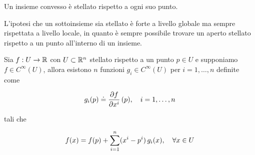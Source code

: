 \begin{remark}
	Un insieme convesso è stellato rispetto a ogni suo punto.
\end{remark}

L'ipotesi che un sottoinsieme sia stellato è forte a livello globale ma sempre rispettata a livello locale, in quanto è sempre possibile trovare un aperto stellato rispetto a un punto all'interno di un insieme.

\begin{theorem}\label{thm:taylor}
	Sia $ f : U \to \mathbb{R} $ con $ U \subset \mathbb{R}^{n} $ stellato rispetto a un punto $ p \in U $ e supponiamo $ f \in C^{\infty}(U) $, allora esistono $ n $ funzioni $ g_{i} \in C^{\infty}(U) $ per $ i = 1,\dots,n $ definite come
	
	\begin{equation}
		g_{i}(p) \doteq \pdv{f}{x^{i}} \, (p) \qcomma i=1,\dots,n
	\end{equation}

	tali che
	
	\begin{equation}
		f(x) = f(p) + \sum_{i=1}^{n} (x^{i}-p^{i}) \, g_{i}(x) \qcomma \forall x \in U
	\end{equation}	
\end{theorem}

